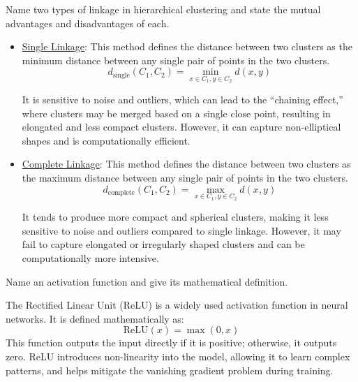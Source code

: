 \documentclass[12pt]{article}
\begin{document}
    \begin{ejercicio}
        Name two types of linkage in hierarchical clustering and state the mutual advantages and disadvantages of each.

        \begin{itemize}
            \item \ul{Single Linkage}: This method defines the distance between two clusters as the minimum distance between any single pair of points in the two clusters.
            \begin{equation*}
                d_{\text{single}}(C_1, C_2) = \min_{x \in C_1, y \in C_2} d(x, y)
            \end{equation*}

            It is sensitive to noise and outliers, which can lead to the ``chaining effect,'' where clusters may be merged based on a single close point, resulting in elongated and less compact clusters. However, it can capture non-elliptical shapes and is computationally efficient.

            \item \ul{Complete Linkage}: This method defines the distance between two clusters as the maximum distance between any single pair of points in the two clusters.
            \begin{equation*}
                d_{\text{complete}}(C_1, C_2) = \max_{x \in C_1, y \in C_2} d(x, y)
            \end{equation*}
            
            It tends to produce more compact and spherical clusters, making it less sensitive to noise and outliers compared to single linkage. However, it may fail to capture elongated or irregularly shaped clusters and can be computationally more intensive.
        \end{itemize}
    \end{ejercicio}

    \begin{ejercicio}
        Name an activation function and give its mathematical definition.

        The Rectified Linear Unit (ReLU) is a widely used activation function in neural networks. It is defined mathematically as:
        \[
        \text{ReLU}(x) = \max(0, x)
        \]
        This function outputs the input directly if it is positive; otherwise, it outputs zero. ReLU introduces non-linearity into the model, allowing it to learn complex patterns, and helps mitigate the vanishing gradient problem during training.
    \end{ejercicio}
\end{document}
